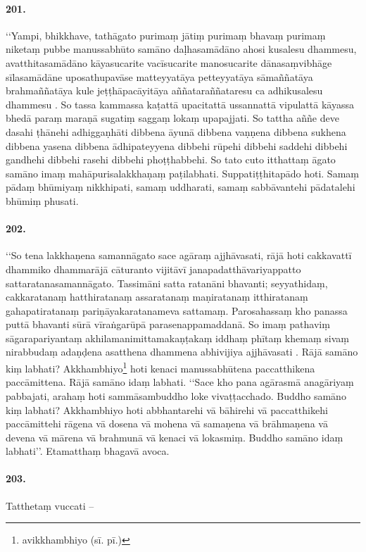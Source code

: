 \paragraph{201.} ‘‘Yampi, bhikkhave, tathāgato purimaṃ jātiṃ purimaṃ bhavaṃ purimaṃ niketaṃ pubbe manussabhūto samāno daḷhasamādāno ahosi kusalesu dhammesu, avatthitasamādāno kāyasucarite vacīsucarite manosucarite dānasaṃvibhāge sīlasamādāne uposathupavāse matteyyatāya petteyyatāya sāmaññatāya brahmaññatāya kule jeṭṭhāpacāyitāya aññataraññataresu ca adhikusalesu dhammesu . So tassa kammassa kaṭattā upacitattā ussannattā vipulattā kāyassa bhedā paraṃ maraṇā sugatiṃ saggaṃ lokaṃ upapajjati. So tattha aññe deve dasahi ṭhānehi adhiggaṇhāti dibbena āyunā dibbena vaṇṇena dibbena sukhena dibbena yasena dibbena ādhipateyyena dibbehi rūpehi dibbehi saddehi dibbehi gandhehi dibbehi rasehi dibbehi phoṭṭhabbehi. So tato cuto itthattaṃ āgato samāno imaṃ mahāpurisalakkhaṇaṃ paṭilabhati. Suppatiṭṭhitapādo hoti. Samaṃ pādaṃ bhūmiyaṃ nikkhipati, samaṃ uddharati, samaṃ sabbāvantehi pādatalehi bhūmiṃ phusati.

\paragraph{202.} ‘‘So tena lakkhaṇena samannāgato sace agāraṃ ajjhāvasati, rājā hoti cakkavattī dhammiko dhammarājā cāturanto vijitāvī janapadatthāvariyappatto sattaratanasamannāgato. Tassimāni satta ratanāni bhavanti; seyyathidaṃ, cakkaratanaṃ hatthiratanaṃ assaratanaṃ maṇiratanaṃ itthiratanaṃ gahapatiratanaṃ pariṇāyakaratanameva sattamaṃ. Parosahassaṃ kho panassa puttā bhavanti sūrā vīraṅgarūpā parasenappamaddanā. So imaṃ pathaviṃ sāgarapariyantaṃ akhilamanimittamakaṇṭakaṃ iddhaṃ phītaṃ khemaṃ sivaṃ nirabbudaṃ adaṇḍena asatthena dhammena abhivijiya ajjhāvasati . Rājā samāno kiṃ labhati? Akkhambhiyo\footnote{avikkhambhiyo (sī. pī.)} hoti kenaci manussabhūtena paccatthikena paccāmittena. Rājā samāno idaṃ labhati. ‘‘Sace kho pana agārasmā anagāriyaṃ pabbajati, arahaṃ hoti sammāsambuddho loke vivaṭṭacchado. Buddho samāno kiṃ labhati? Akkhambhiyo hoti abbhantarehi vā bāhirehi vā paccatthikehi paccāmittehi rāgena vā dosena vā mohena vā samaṇena vā brāhmaṇena vā devena vā mārena vā brahmunā vā kenaci vā lokasmiṃ. Buddho samāno idaṃ labhati’’. Etamatthaṃ bhagavā avoca.

\paragraph{203.} Tatthetaṃ vuccati –

